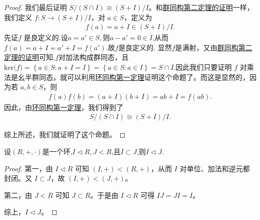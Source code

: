 \documentclass[../../main.tex]{subfiles}
\begin{document}
\begin{proof}
我们最后证明 $S / (S \cap I) \cong (S + I) / I$。和\hyperref[theorem:群同构第二定理]{群同构第二定理的证明}一样，我们定义 $f : S \to (S + I) / I$，对 $a \in S$，定义为
\begin{align*}
f(a) = a + I \in (S + I) / I.
\end{align*}
先证$f$ 是良定义的.设$a=a'\in S,$则$a-a'=0\in I$,从而$f(a)=a+I=a'+I=f(a')$.故$f$是良定义的.
显然$f$是满射，又由\hyperref[theorem:群同构第二定理]{群同构第二定理的证明}可知,$f$对加法构成群同态，且 $\mathrm{ker(}f)=\left\{ a\in S:a+I=I \right\} =\left\{ a\in S:a\in I \right\} =S\cap I.$因此我们只要证明 $f$ 对乘法是幺半群同态，就可以利用\hyperref[theorem:环同构第一定理]{环同构第一定理}证明这个命题了。而这是显然的，因为若 $a, b \in S$，则
\begin{align*}
f(a)f(b) = (a + I)(b + I) = ab + I = f(ab).
\end{align*}
因此，由\hyperref[theorem:环同构第一定理]{环同构第一定理}，我们得到了
\begin{align*}
S / (S \cap I) \cong (S + I) / I .
\end{align*}

综上所述，我们就证明了这个命题。
\end{proof}

\begin{lemma}\label{lemma:理想的"传递性"}
设$(R,+,\cdot)$是一个环,$I\lhd R,J<R$,且$I\subset J$,则$I\lhd J$.
\end{lemma}
\begin{proof}
第一，由 $I \lhd  R$ 可知 $(I, +) < (R, +)$，从而 $I$ 对单位、加法和逆元都封闭。又 $I \subset J$，故 $(I, +) < (J, +)$。

第二，由 $J < R$ 可知 $J \subset R$。于是由 $I \lhd  R$ 可得 $IJ = JI = I$。

综上，$I \lhd  J$。 
\end{proof}
\end{document}
